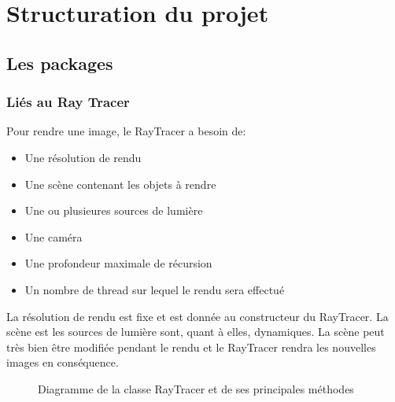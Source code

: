 \documentclass[11pt]{article}
\begin{document}
\section{Structuration du projet}
\subsection{Les packages}
\subsubsection{Liés au Ray Tracer}

Pour rendre une image, le RayTracer a besoin de:
\begin{itemize}
	\item{Une résolution de rendu}
	\item{Une scène contenant les objets à rendre}
	\item{Une ou plusieures sources de lumière}
	\item{Une caméra}
	\item{Une profondeur maximale de récursion}
	\item{Un nombre de thread sur lequel le rendu sera effectué}
\end{itemize}
La résolution de rendu est fixe et est donnée au constructeur du RayTracer. La scène est les sources de lumière sont, quant à elles, dynamiques. La scène peut très bien être modifiée pendant le rendu et le RayTracer rendra les nouvelles images en conséquence.

\begin{figure}[h!]
	
	\caption{Diagramme de la classe RayTracer et de ses principales méthodes}
	\label{diagrammeRayTracer}
\end{figure}
\FloatBarrier
\end{document}
